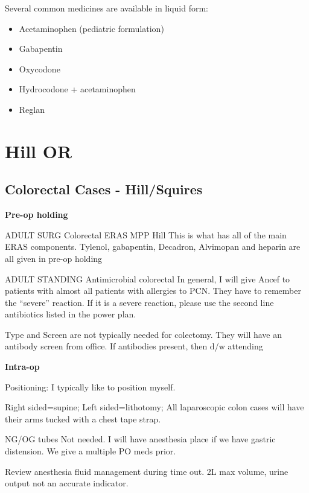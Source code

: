 \documentclass[
]{book}
\providecommand{\tightlist}{%
  \setlength{\itemsep}{0pt}\setlength{\parskip}{0pt}}
\begin{document}
Several common medicines are available in liquid form:

\begin{itemize}
\tightlist
\item
  Acetaminophen (pediatric formulation)
\item
  Gabapentin
\item
  Oxycodone
\item
  Hydrocodone + acetaminophen
\item
  Reglan
\end{itemize}

\hypertarget{part-hill-or}{%
\part*{Hill OR}\label{part-hill-or}}

\hypertarget{colorectal-cases---hillsquires}{%
\chapter{Colorectal Cases - Hill/Squires}\label{colorectal-cases---hillsquires}}

\textbf{Pre-op holding}

ADULT SURG Colorectal ERAS MPP Hill This is what has all of the main ERAS components. Tylenol, gabapentin, Decadron, Alvimopan and heparin are all given in pre-op holding

ADULT STANDING Antimicrobial colorectal In general, I will give Ancef to patients with almost all patients with allergies to PCN. They have to remember the ``severe'' reaction. If it is a severe reaction, please use the second line antibiotics listed in the power plan.

Type and Screen are not typically needed for colectomy. They will have an antibody screen from office. If antibodies present, then d/w attending

\textbf{Intra-op}

Positioning: I typically like to position myself.

Right sided=supine; Left sided=lithotomy; All laparoscopic colon cases will have their arms tucked with a chest tape strap.

NG/OG tubes Not needed. I will have anesthesia place if we have gastric distension. We give a multiple PO meds prior.

Review anesthesia fluid management during time out. 2L max volume, urine output not an accurate indicator.
\end{document}
